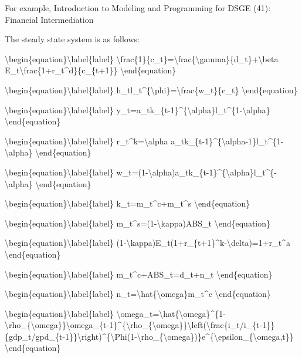 \documentclass[10pt,math=newtx,citestyle=gb7714-2015,bibstyle=gb7714-2015]{elegantbook}
\begin{document}
	For example, Introduction to Modeling and Programming for DSGE (41): Financial Intermediation
	
	The steady state system is as follows:
	
	\textbackslash{}begin\{equation\}\textbackslash{}label\{label\}
	\textbackslash{}frac\{1\}\{c\_t\}=\textbackslash{}frac\{\textbackslash{}gamma\}\{d\_t\}+\textbackslash{}beta E\_t\textbackslash{}frac\{1+r\_t\^{}d\}\{c\_\{t+1\}\}
	\textbackslash{}end\{equation\}
	
	\textbackslash{}begin\{equation\}\textbackslash{}label\{label\}
	h\_tl\_t\^{}\{\textbackslash{}phi\}=\textbackslash{}frac\{w\_t\}\{c\_t\}
	\textbackslash{}end\{equation\}
	
	\textbackslash{}begin\{equation\}\textbackslash{}label\{label\}
	y\_t=a\_tk\_\{t-1\}\^{}\{\textbackslash{}alpha\}l\_t\^{}\{1-\textbackslash{}alpha\}
	\textbackslash{}end\{equation\}
	
	\textbackslash{}begin\{equation\}\textbackslash{}label\{label\}
	r\_t\^{}k=\textbackslash{}alpha a\_tk\_\{t-1\}\^{}\{\textbackslash{}alpha-1\}l\_t\^{}\{1-\textbackslash{}alpha\}
	\textbackslash{}end\{equation\}
	
	\textbackslash{}begin\{equation\}\textbackslash{}label\{label\}
	w\_t=(1-\textbackslash{}alpha)a\_tk\_\{t-1\}\^{}\{\textbackslash{}alpha\}l\_t\^{}\{-\textbackslash{}alpha\}
	\textbackslash{}end\{equation\}
	
	\textbackslash{}begin\{equation\}\textbackslash{}label\{label\}
	k\_t=m\_t\^{}c+m\_t\^{}s
	\textbackslash{}end\{equation\}
	
	\textbackslash{}begin\{equation\}\textbackslash{}label\{label\}
	m\_t\^{}s=(1-\textbackslash{}kappa)ABS\_t
	\textbackslash{}end\{equation\}
	
	\textbackslash{}begin\{equation\}\textbackslash{}label\{label\}
	(1-\textbackslash{}kappa)E\_t(1+r\_\{t+1\}\^{}k-\textbackslash{}delta)=1+r\_t\^{}a
	\textbackslash{}end\{equation\}
	
	\textbackslash{}begin\{equation\}\textbackslash{}label\{label\}
	m\_t\^{}c+ABS\_t=d\_t+n\_t
	\textbackslash{}end\{equation\}
	
	\textbackslash{}begin\{equation\}\textbackslash{}label\{label\}
	n\_t=\textbackslash{}hat\{\textbackslash{}omega\}m\_t\^{}c
	\textbackslash{}end\{equation\}
	
	\textbackslash{}begin\{equation\}\textbackslash{}label\{label\}
	\textbackslash{}omega\_t=\textbackslash{}hat\{\textbackslash{}omega\}\^{}\{1-\textbackslash{}rho\_\{\textbackslash{}omega\}\}\textbackslash{}omega\_\{t-1\}\^{}\{\textbackslash{}rho\_\{\textbackslash{}omega\}\}\textbackslash{}left(\textbackslash{}frac\{i\_t/i\_\{t-1\}\}\{gdp\_t/gpd\_\{t-1\}\}\textbackslash{}right)\^{}\{\textbackslash{}Phi(1-\textbackslash{}rho\_\{\textbackslash{}omega\})\}e\^{}\{\textbackslash{}epsilon\_\{\textbackslash{}omega,t\}\}
	\textbackslash{}end\{equation\}
	
\end{document}
